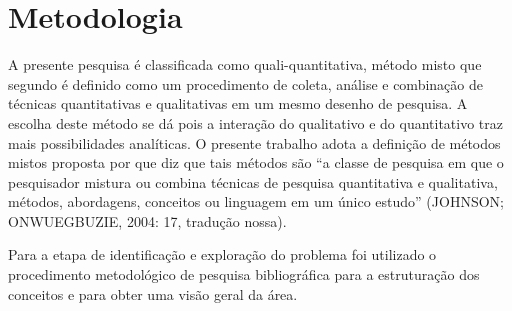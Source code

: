 \begin{itemize}






\end{itemize}

\section{Metodologia}\label{sec:Metodologia}
A presente pesquisa é classificada como quali-quantitativa, método misto que segundo  é definido como um
procedimento de coleta, análise e combinação de técnicas quantitativas e qualitativas em um mesmo desenho de pesquisa. A escolha deste método se dá pois a interação do qualitativo e do quantitativo traz mais possibilidades analíticas. O presente trabalho adota a definição de métodos mistos proposta por  que diz que tais métodos são “a classe de pesquisa em que o pesquisador mistura ou combina técnicas de pesquisa quantitativa e qualitativa, métodos, abordagens, conceitos ou linguagem em um único estudo” (JOHNSON; ONWUEGBUZIE, 2004: 17, tradução nossa).

Para a etapa de identificação e exploração do problema foi utilizado o procedimento metodológico de pesquisa bibliográfica para a estruturação dos conceitos e para obter uma visão geral da área.

